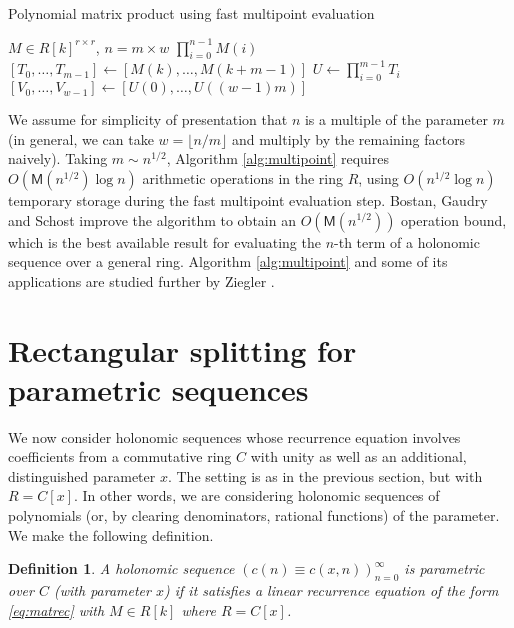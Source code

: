 \documentclass{sig-alternate}
\newtheorem{definition}[theorem]{Definition}
\newcommand   \M      {\mathsf{M}}
\begin{document}
\begin{algorithm}
  \caption{Polynomial matrix product using fast multipoint evaluation}
  \label{alg:multipoint}
  \begin{algorithmic}[1]
    \Require $M \in R[k]^{r \times r}$, $n = m \times w$
    \Ensure $\prod_{i=0}^{n-1} M(i)$
    \State $[T_0, \ldots, T_{m-1}] \gets [M(k), \ldots, M(k+m-1)]$
    \Statex {}
    \State $U \gets \prod_{i=0}^{m-1} T_i$ 
    \State $[V_0, \ldots, V_{w-1}] \gets [U(0), \ldots, U((w-1)m)]$
    \Statex {}
    \State {} 
  \end{algorithmic}
\end{algorithm}

We assume for simplicity of presentation
that $n$ is a multiple of the parameter
$m$ (in general, we can take $w = \lfloor n / m \rfloor$
and multiply by the remaining factors naively).
Taking $m \sim n^{1/2}$,
Algorithm \ref{alg:multipoint} requires $O(\M(n^{1/2}) \log n)$
arithmetic operations in the ring $R$,
using $O(n^{1/2} \log n)$ temporary storage
during the fast multipoint evaluation step.
Bostan, Gaudry and Schost \cite{BostanGaudrySchost2007} improve
the algorithm to obtain an $O(\textsf{M}(n^{1/2}))$
operation bound, which is the best available result for evaluating the
$n$-th term of a holonomic sequence over a general ring.
Algorithm \ref{alg:multipoint} and some of its applications
are studied further by Ziegler \cite{Ziegler2005}.

\section{Rectangular splitting for \\ parametric sequences} \label{sect:rectangular}

We now consider holonomic sequences whose recurrence equation
involves coefficients from a commutative ring $C$ with unity
as well as an additional, distinguished parameter $x$.
The setting is as in the previous section, but with
$R = C[x]$. In other words, we are considering
holonomic sequences of polynomials (or, by clearing denominators, rational functions)
of the parameter. We make the following definition.

\begin{definition}
A holonomic sequence
$(c(n) \equiv c(x,n))_{n=0}^{\infty}$
is parametric over $C$ (with parameter $x$)
if it satisfies a linear recurrence equation of
the form \eqref{eq:matrec} with $M \in R[k]$ where $R = C[x]$.
\end{definition}
\end{document}
